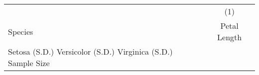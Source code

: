 \begin{tabular}{lc}
\toprule
& (1) \\
Species & Petal Length \\
Setosa
\hspace{3mm} (S.D.)
Versicolor
\hspace{3mm} (S.D.)
Virginica
\hspace{3mm} (S.D.)
Sample Size
\bottomrule
\end{tabular}
